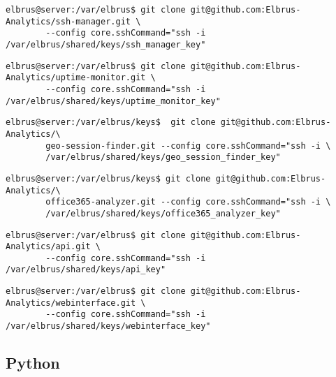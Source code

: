 \documentclass{article}
\begin{document}
	\lstset{style=commands}
	\begin{lstlisting}[caption={Clonen der 'SSH-Manager' Software.}]
		elbrus@server:/var/elbrus$ git clone git@github.com:Elbrus-Analytics/ssh-manager.git \
		--config core.sshCommand="ssh -i /var/elbrus/shared/keys/ssh_manager_key"
	\end{lstlisting}
	
	\lstset{style=commands}
	\begin{lstlisting}[caption={Clonen der 'Uptime-Monitor' Software.}]
		elbrus@server:/var/elbrus$ git clone git@github.com:Elbrus-Analytics/uptime-monitor.git \
		--config core.sshCommand="ssh -i /var/elbrus/shared/keys/uptime_monitor_key"
	\end{lstlisting}

	\lstset{style=commands}
	\begin{lstlisting}[caption={Clonen der 'geo session finders' Software.}]
		elbrus@server:/var/elbrus/keys$  git clone git@github.com:Elbrus-Analytics/\
		geo-session-finder.git --config core.sshCommand="ssh -i \
		/var/elbrus/shared/keys/geo_session_finder_key"
	\end{lstlisting}

	\lstset{style=commands}
	\begin{lstlisting}[caption={Clonen der 'office365-analyzer' Software.}]
		elbrus@server:/var/elbrus/keys$ git clone git@github.com:Elbrus-Analytics/\
		office365-analyzer.git --config core.sshCommand="ssh -i \
		/var/elbrus/shared/keys/office365_analyzer_key"
	\end{lstlisting}
	
	\lstset{style=commands}
	\begin{lstlisting}[caption={Clonen der 'API' Software.}]
		elbrus@server:/var/elbrus$ git clone git@github.com:Elbrus-Analytics/api.git \
		--config core.sshCommand="ssh -i /var/elbrus/shared/keys/api_key"
	\end{lstlisting}

	\lstset{style=commands}
	\begin{lstlisting}[caption={Clonen der 'Webinterface' Software}]
		elbrus@server:/var/elbrus$ git clone git@github.com:Elbrus-Analytics/webinterface.git \
		--config core.sshCommand="ssh -i /var/elbrus/shared/keys/webinterface_key"
	\end{lstlisting}
	\newpage
	
	\subsection{Python}
\end{document}
